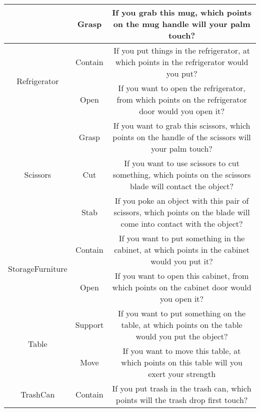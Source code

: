 \documentclass[final]{cvpr}
\begin{document}
\begin{table*}[t]
{\begin{tabular}{c|c|c}
                                      & Grasp               & If you grab this mug, which points on the mug handle will your palm touch?                                                                       \\ \hline
    \multirow{2}{*}{Refrigerator}     & Contain             & If you put things in the refrigerator, at which points in the refrigerator would you put?                                                        \\
                                      & Open                & If you want to open the refrigerator, from which points on the refrigerator door would you open it?                                              \\ \hline
    \multirow{3}{*}{Scissors}         & Grasp               & If you want to grab this scissors, which points on the handle of the scissors will your palm touch?                                              \\
                                      & Cut                 & If you want to use scissors to cut something, which points on the scissors blade will contact the object?                                        \\
                                      & Stab                & If you poke an object with this pair of scissors, which points on the blade will come into contact with the object?                              \\ \hline
    \multirow{2}{*}{StorageFurniture} & Contain             & If you want to put something in the cabinet, at which points in the cabinet would you put it?                                                    \\
                                      & Open                & If you want to open this cabinet, from which points on the cabinet door would you open it?                                                       \\ \hline
    \multirow{2}{*}{Table}            & Support             & If you want to put something on the table, at which points on the table would you put the object?                                                \\
                                      & Move                & If you want to move this table, at which points on this table will you exert your strength                                                       \\ \hline
    \multirow{3}{*}{TrashCan}         & Contain             & If you put trash in the trash can, which points will the trash drop first touch?                                                                 \\

\end{tabular}}
\end{table*}
\end{document}
